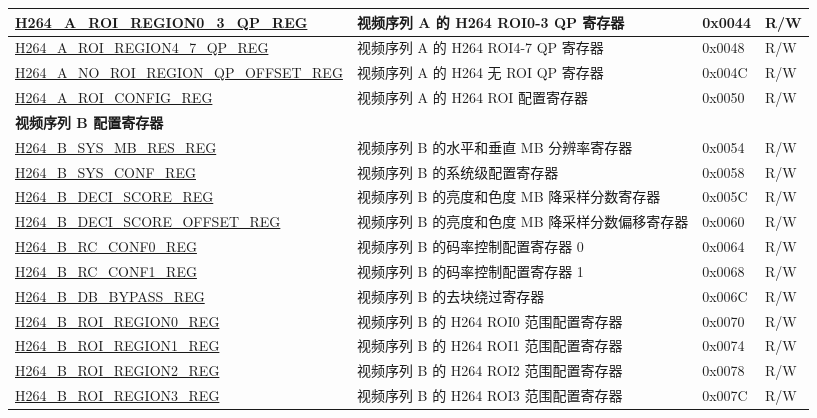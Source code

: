 \begin{longtable}{ | p{7cm} | p{6.2cm} | p{1.2cm} | p{1cm} | }
\hyperref[regdesc:H264AROIREGION03QPREG]{H264\_A\_ROI\_REGION0\_3\_QP\_REG} & 视频序列 A 的 H264 ROI0-3 QP 寄存器 & 0x0044 & R/W \\ \hline
\hyperref[regdesc:H264AROIREGION47QPREG]{H264\_A\_ROI\_REGION4\_7\_QP\_REG} & 视频序列 A 的 H264 ROI4-7 QP 寄存器 & 0x0048 & R/W \\ \hline
\hyperref[regdesc:H264ANOROIREGIONQPOFFSETREG]{H264\_A\_NO\_ROI\_REGION\_QP\_OFFSET\_REG} & 视频序列 A 的 H264 无 ROI QP 寄存器 & 0x004C & R/W \\ \hline
\hyperref[regdesc:H264AROICONFIGREG]{H264\_A\_ROI\_CONFIG\_REG} & 视频序列 A 的 H264 ROI 配置寄存器 & 0x0050 & R/W \\ \hline

\multicolumn{4}{|l|}{\textbf{视频序列 B 配置寄存器}} \\ \hline
\hyperref[regdesc:H264BSYSMBRESREG]{H264\_B\_SYS\_MB\_RES\_REG} & 视频序列 B 的水平和垂直 MB 分辨率寄存器 & 0x0054 & R/W \\ \hline
\hyperref[regdesc:H264BSYSCONFREG]{H264\_B\_SYS\_CONF\_REG} & 视频序列 B 的系统级配置寄存器 & 0x0058 & R/W \\ \hline
\hyperref[regdesc:H264BDECISCOREREG]{H264\_B\_DECI\_SCORE\_REG} & 视频序列 B 的亮度和色度 MB 降采样分数寄存器 & 0x005C & R/W \\ \hline
\hyperref[regdesc:H264BDECISCOREOFFSETREG]{H264\_B\_DECI\_SCORE\_OFFSET\_REG} & 视频序列 B 的亮度和色度 MB 降采样分数偏移寄存器 & 0x0060 & R/W \\ \hline
\hyperref[regdesc:H264BRCCONF0REG]{H264\_B\_RC\_CONF0\_REG} & 视频序列 B 的码率控制配置寄存器 0 & 0x0064 & R/W \\ \hline
\hyperref[regdesc:H264BRCCONF1REG]{H264\_B\_RC\_CONF1\_REG} & 视频序列 B 的码率控制配置寄存器 1 & 0x0068 & R/W \\ \hline
\hyperref[regdesc:H264BDBBYPASSREG]{H264\_B\_DB\_BYPASS\_REG} & 视频序列 B 的去块绕过寄存器 & 0x006C & R/W \\ \hline
\hyperref[regdesc:H264BROIREGION0REG]{H264\_B\_ROI\_REGION0\_REG} & 视频序列 B 的 H264 ROI0 范围配置寄存器 & 0x0070 & R/W \\ \hline
\hyperref[regdesc:H264BROIREGION1REG]{H264\_B\_ROI\_REGION1\_REG} & 视频序列 B 的 H264 ROI1 范围配置寄存器 & 0x0074 & R/W \\ \hline
\hyperref[regdesc:H264BROIREGION2REG]{H264\_B\_ROI\_REGION2\_REG} & 视频序列 B 的 H264 ROI2 范围配置寄存器 & 0x0078 & R/W \\ \hline
\hyperref[regdesc:H264BROIREGION3REG]{H264\_B\_ROI\_REGION3\_REG} & 视频序列 B 的 H264 ROI3 范围配置寄存器 & 0x007C & R/W \\ \hline

\end{longtable}
